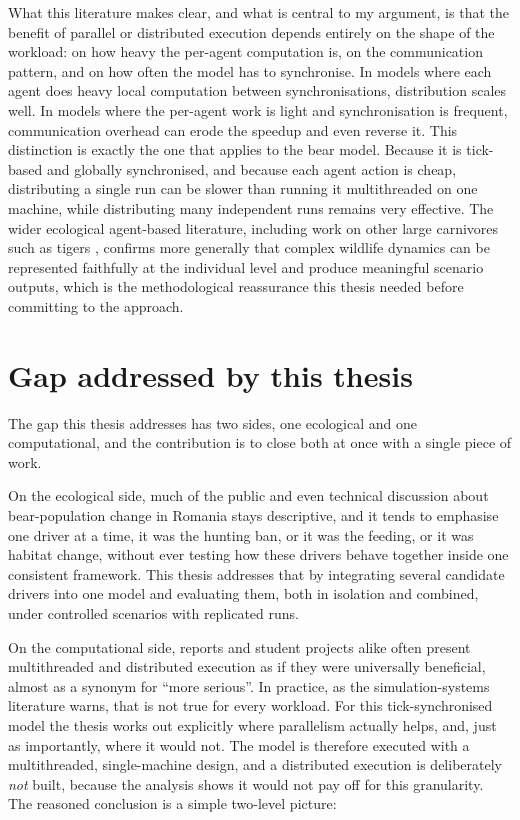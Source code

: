 What this literature makes clear, and what is central to my argument, is that the benefit of parallel or distributed execution depends entirely on the shape of the workload: on how heavy the per-agent computation is, on the communication pattern, and on how often the model has to synchronise. In models where each agent does heavy local computation between synchronisations, distribution scales well. In models where the per-agent work is light and synchronisation is frequent, communication overhead can erode the speedup and even reverse it. This distinction is exactly the one that applies to the bear model. Because it is tick-based and globally synchronised, and because each agent action is cheap, distributing a single run can be slower than running it multithreaded on one machine, while distributing many independent runs remains very effective. The wider ecological agent-based literature, including work on other large carnivores such as tigers \cite{Carter2015}, confirms more generally that complex wildlife dynamics can be represented faithfully at the individual level and produce meaningful scenario outputs, which is the methodological reassurance this thesis needed before committing to the approach.

\section{Gap addressed by this thesis}

The gap this thesis addresses has two sides, one ecological and one computational, and the contribution is to close both at once with a single piece of work.

On the ecological side, much of the public and even technical discussion about bear-population change in Romania stays descriptive, and it tends to emphasise one driver at a time, it was the hunting ban, or it was the feeding, or it was habitat change, without ever testing how these drivers behave together inside one consistent framework. This thesis addresses that by integrating several candidate drivers into one model and evaluating them, both in isolation and combined, under controlled scenarios with replicated runs.

On the computational side, reports and student projects alike often present multithreaded and distributed execution as if they were universally beneficial, almost as a synonym for ``more serious''. In practice, as the simulation-systems literature warns, that is not true for every workload. For this tick-synchronised model the thesis works out explicitly where parallelism actually helps, and, just as importantly, where it would not. The model is therefore executed with a multithreaded, single-machine design, and a distributed execution is deliberately \emph{not} built, because the analysis shows it would not pay off for this granularity. The reasoned conclusion is a simple two-level picture:

